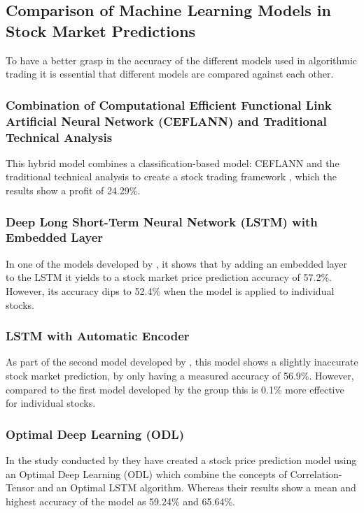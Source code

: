 \subsection{Comparison of Machine Learning Models in Stock Market Predictions}
\label{subsec:comparison_ml}
To have a better grasp in the accuracy of the different models 
used in algorithmic trading it is essential that different models are 
compared against each other.

\subsubsection{Combination of Computational Efficient Functional Link Artificial Neural Network (CEFLANN) and Traditional Technical Analysis}
\label{subsubsec:ceflann}
This hybrid model combines a classification-based model: CEFLANN and 
the traditional technical analysis to create a stock trading framework 
, which the results show a profit of 24.29\%.

\subsubsection{Deep Long Short-Term Neural Network (LSTM) with Embedded Layer}
\label{subsubsec:lstm}
In one of the models developed by , 
it shows that by adding an embedded layer to the LSTM it yields to a 
stock market price prediction accuracy of 57.2\%. 
However, its accuracy dips to 52.4\% when the model is applied to individual stocks.

\subsubsection{LSTM with Automatic Encoder}
\label{subsubsec:lstm_autoencoder}
As part of the second model developed by , this model 
shows a slightly inaccurate stock market prediction, by only having 
a measured accuracy of 56.9\%. 
However, compared to the first model developed by the group this is 0.1\%
more effective for individual stocks.

\subsubsection{Optimal Deep Learning (ODL)}
\label{subsubsec:odl}
In the study conducted by  they have created a 
stock price prediction model using an Optimal Deep Learning (ODL) 
which combine the concepts of Correlation-Tensor and an Optimal LSTM algorithm. 
Whereas their results show a mean and highest accuracy of the model as 59.24\% 
and 65.64\%.

